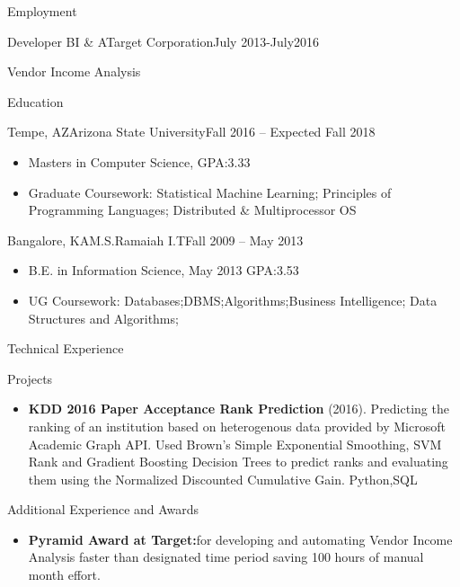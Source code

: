 \documentclass[]{nakulcv}
\begin{document}
\begin{cvsection}{Employment}
\begin{cvsubsection}{Developer BI \& A}{Target Corporation}{July 2013-July2016}
\begin{cvsubsection}{Vendor Income Analysis}{}{}
\begin{itemize}
				\end{itemize}
			\end{cvsubsection}
		\end{cvsubsection}
	\begin{cvsection}{Education}
		\begin{cvsubsection}{Tempe, AZ}{Arizona State University}{Fall 2016 -- Expected Fall 2018}
			\begin{itemize}
				\item Masters in Computer Science, GPA:3.33
				\item Graduate Coursework: Statistical Machine Learning; Principles of Programming Languages; Distributed \& Multiprocessor OS
			\end{itemize}
		\end{cvsubsection}
		\begin{cvsubsection}{Bangalore, KA}{M.S.Ramaiah I.T}{Fall 2009 -- May 2013}
			\begin{itemize}
				\item B.E. in Information Science, May 2013 GPA:3.53
				\item UG Coursework: Databases;DBMS;Algorithms;Business Intelligence; Data Structures and Algorithms;
			\end{itemize}
		\end{cvsubsection}
	\end{cvsection}
	\begin{cvsection}{Technical Experience}
		\begin{cvsubsection}{Projects}{}{}
			\begin{itemize}
				\item \textbf{KDD 2016 Paper Acceptance Rank Prediction} (2016). Predicting the ranking of an institution based on heterogenous data provided by Microsoft Academic Graph API. Used Brown's Simple Exponential Smoothing, SVM Rank and Gradient Boosting Decision Trees to predict ranks and evaluating them using the Normalized Discounted Cumulative Gain. Python,SQL 
			\end{itemize}
		\end{cvsubsection}
	\end{cvsection}
	\begin{cvsection}{Additional Experience and Awards}
		\begin{cvsubsection}{}{}{}	
			\begin{itemize}
				\item \textbf{Pyramid Award at Target:}for developing and automating Vendor Income Analysis faster than designated time period saving 100 hours of manual month effort.

\end{itemize}
\end{cvsubsection}
\end{cvsection}
\end{cvsection}
\end{document}
